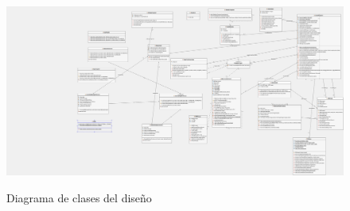 \begin{landscape}

\begin{figure}[H] %
\centering
\includegraphics[scale=0.15, angle=270]{imagenes/diagramaTotal.png}  %
\label{diagramaTotal.jpg}
\caption{Diagrama de clases del diseño}
\end{figure}




\end{landscape}













